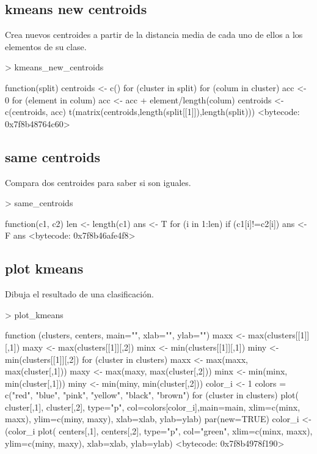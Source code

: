 \documentclass [a4paper] {article}
\begin{document}
\subsection{kmeans new centroids}
Crea nuevos centroides a partir de la distancia media de cada uno de ellos a los elementos de su clase.
\begin{Schunk}
\begin{Sinput}
> kmeans_new_centroids
\end{Sinput}
\begin{Soutput}
function(split){
  centroids <- c()
  for (cluster in split) {
    for (colum in cluster) {
      acc <- 0
      for (element in colum){
        acc <- acc + element/length(colum)
      }
      centroids <- c(centroids, acc)
    }
  }
  t(matrix(centroids,length(split[[1]]),length(split)))
}
<bytecode: 0x7f8b48764c60>
\end{Soutput}
\end{Schunk}
\subsection{same centroids}
Compara dos centroides para saber si son iguales.
\begin{Schunk}
\begin{Sinput}
> same_centroids
\end{Sinput}
\begin{Soutput}
function(c1, c2){
  len <- length(c1)
  ans <- T
  for (i in 1:len){
    if (c1[i]!=c2[i]){
      ans <- F
    }
  }
  ans
}
<bytecode: 0x7f8b46afe4f8>
\end{Soutput}
\end{Schunk}
\subsection{plot kmeans}
Dibuja el resultado de una clasificación.
\begin{Schunk}
\begin{Sinput}
> plot_kmeans
\end{Sinput}
\begin{Soutput}
function (clusters, centers, main="", xlab="", ylab="") {
  maxx <- max(clusters[[1]][,1])
  maxy <- max(clusters[[1]][,2])
  minx <- min(clusters[[1]][,1])
  miny <- min(clusters[[1]][,2])
  for (cluster in clusters){
    maxx <- max(maxx, max(cluster[,1]))
    maxy <- max(maxy, max(cluster[,2]))
    minx <- min(minx, min(cluster[,1]))
    miny <- min(miny, min(cluster[,2]))
  }
  color_i <- 1
  colors = c("red", "blue", "pink", "yellow", "black", "brown")
  for (cluster in clusters){
    plot( cluster[,1], cluster[,2], type="p", col=colors[color_i],main=main,
          xlim=c(minx, maxx), ylim=c(miny, maxy), xlab=xlab, ylab=ylab)
    par(new=TRUE)
    color_i <- (color_i%
  }
  plot( centers[,1], centers[,2], type="p", col="green",
        xlim=c(minx, maxx), ylim=c(miny, maxy), xlab=xlab, ylab=ylab)
}
<bytecode: 0x7f8b4978f190>
\end{Soutput}
\end{Schunk}
\end{document}
